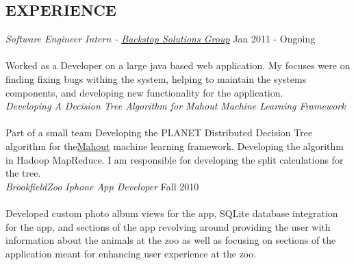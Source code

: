\documentclass[margin]{res}
\newcommand{\tab}{\hspace*{2em}}
\begin{document}
\begin{resume}
                 
\section{EXPERIENCE} 
								{\sl Software Engineer Intern - \href{http://backstopsolutions.com/}{Backstop Solutions Group}} \hfill            Jan 2011 - Ongoing \\ \\
														\tab Worked as a Developer on a large java based web application. My focuses were on finding 
																 fixing bugs withing the system, helping to maintain the systems components, and developing 
																 new functionality for the application. \\

								{\sl Developing A Decision Tree Algorithm for Mahout Machine Learning Framework} \\ \\
														\tab Part of a small team Developing the PLANET Distributed Decision Tree algorithm for the\href{http://mahout.apache.org/}{Mahout} 
																 machine learning framework. Developing the algorithm in Hadoop MapReduce. I am responsible for developing the
																 split calculations for the tree.\\
														 		  
                {\sl BrookfieldZoo Iphone App Developer} \hfill            Fall 2010 \\ \\
														\tab Developed custom photo album views for the app, SQLite database integration for the app, 
																 and sections of the app revolving around providing the user with information about the animals
																 at the zoo as well as focusing on sections of the application meant for enhancing user experience
																 at the zoo. \\
 

\end{resume}
\end{document}
